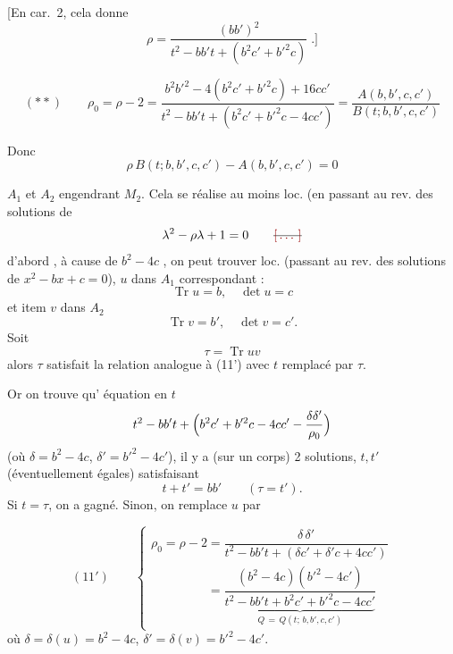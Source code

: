 \documentclass[11pt,a4paper]{article}
\begin{document}
[En car.~2, cela donne
\[
\rho = \frac{(bb')^2}{t^2 - bb't + (b^2c' + b'^2c)} \; .]
\]

\[
(**)\qquad \rho_0 = \rho - 2 = \frac{b^2b'^2 - 4(b^2c' + b'^2c) + 16cc'}{t^2 - bb't + (b^2c' + b'^2c - 4cc')} = \frac{A(b, b', c, c')}{B(t; b, b', c, c')}
\]

Donc
\[
\rho\, B(t; b, b', c, c') - A(b, b', c, c') = 0
\]

$A_1$ et $A_2$  engendrant $M_2$. Cela se réalise au moins loc.  (en passant au  rev. des solutions de
\[
\lambda^2 - \rho\lambda + 1 = 0 \qquad \text{\struck{\ill{}}}
\]
d'abord , à cause de $b^2 - 4c$ ,
on peut trouver loc.  (passant au rev. des solutions de $x^2 - bx + c = 0$),
$u$ dans $A_1$ correspondant :
\[
\operatorname{Tr} u = b, \quad \det u = c
\]
et item $v$ dans $A_2$
\[
\operatorname{Tr} v = b', \quad \det v = c' .
\]
Soit \struck{\ill{}}
\[
\tau = \operatorname{Tr} uv
\]
alors $\tau$ satisfait la relation analogue à (11') avec $t$ remplacé par $\tau$.

Or on trouve qu' équation en $t$
\[
t^2 - bb't + \Bigl(b^2c' + b'^2c - 4cc' - \frac{\delta\delta'}{\rho_0}\Bigr)
\]
(où $\delta = b^2 - 4c$, $\delta' = b'^2 - 4c'$), il y a \struck{\ill{}}  (sur un corps)  2 solutions,  $t, t'$ (éventuellement égales) satisfaisant
\[
t + t' = bb' \qquad (\tau = t') .
\]
Si $t = \tau$, on a gagné. Sinon, on remplace $u$ par

\[
(11')\qquad
\begin{cases}
\rho_0 = \rho - 2 = \dfrac{\delta\,\delta'}{t^2 - bb't + (\delta c' + \delta'c + 4cc')}\\[2ex]
\phantom{\rho_0 = \rho - 2} = \dfrac{(b^2 - 4c)(b'^2 - 4c')}{\underbrace{t^2 - bb't + b^2c' + b'^2c - 4cc'}_{Q\,=\,Q(t;\, b, b', c, c')}}
\end{cases}
\]
où $\delta = \delta(u) = b^2 - 4c$, $\delta' = \delta(v) = b'^2 - 4c'$.
\end{document}
